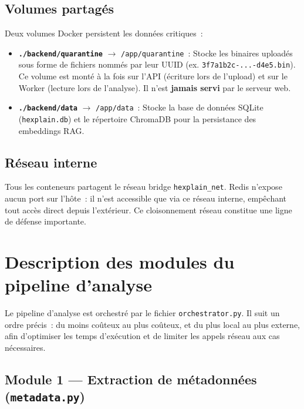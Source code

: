 \subsection{Volumes partagés}

Deux volumes Docker persistent les données critiques~:
\begin{itemize}
  \item \textbf{\texttt{./backend/quarantine}} $\rightarrow$ \texttt{/app/quarantine}~: Stocke les binaires uploadés sous forme de fichiers nommés par leur UUID (ex. \texttt{3f7a1b2c-...-d4e5.bin}). Ce volume est monté à la fois sur l'API (écriture lors de l'upload) et sur le Worker (lecture lors de l'analyse). Il n'est \textbf{jamais servi} par le serveur web.
  \item \textbf{\texttt{./backend/data}} $\rightarrow$ \texttt{/app/data}~: Stocke la base de données SQLite (\texttt{hexplain.db}) et le répertoire ChromaDB pour la persistance des embeddings RAG.
\end{itemize}

\subsection{Réseau interne}

Tous les conteneurs partagent le réseau bridge \texttt{hexplain\_net}. Redis n'expose aucun port sur l'hôte~: il n'est accessible que via ce réseau interne, empêchant tout accès direct depuis l'extérieur. Ce cloisonnement réseau constitue une ligne de défense importante.

\section{Description des modules du pipeline d'analyse}

Le pipeline d'analyse est orchestré par le fichier \texttt{orchestrator.py}. Il suit un ordre précis~: du moins coûteux au plus coûteux, et du plus local au plus externe, afin d'optimiser les temps d'exécution et de limiter les appels réseau aux cas nécessaires.

\subsection{Module 1 --- Extraction de métadonnées (\texttt{metadata.py})}


